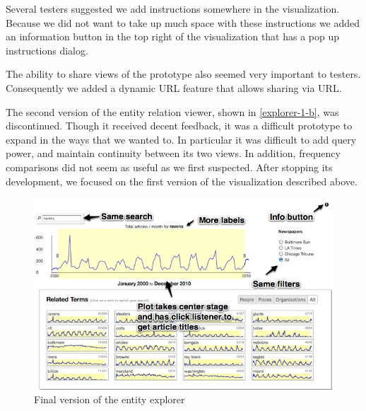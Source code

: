 Several testers suggested we add instructions somewhere in the visualization. Because we did not want to take up much space with these instructions we added an information button in the top right of the visualization that has a pop up instructions dialog.

The ability to share views of the prototype also seemed very important to testers. Consequently we added a dynamic URL feature that allows sharing via URL.

The second version of the entity relation viewer, shown in \ref{explorer-1-b}, was discontinued. Though it received decent feedback, it was a difficult prototype to expand in the ways that we wanted to. In particular it was difficult to add query power, and maintain continuity between its two views. In addition, frequency comparisons did not seem as useful as we first suspected. After stopping its development, we focused on the first version of the visualization described above.

\begin{figure}[htb]
  \centerline{
    \includegraphics[scale=0.37]{figures/finalTe.jpg}
  }
  \caption{Final version of the entity explorer}
  \label{fig:explorer-1}
\end{figure}
